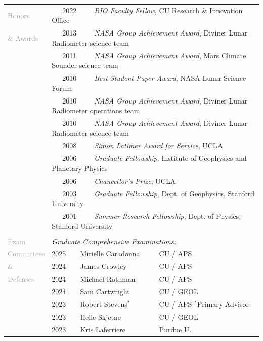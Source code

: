 \documentclass[letterpaper,10pt,twoside]{article}
\begin{document}
\noindent \begin{tabular}{@{} l l l l}
\large{\textcolor{darkgray}{Honors}} & \multicolumn{3}{l}{~~~2022~~~~~\textit{RIO Faculty Fellow}, CU Research \& Innovation Office} \\
\large{\textcolor{darkgray}{\& Awards}} & \multicolumn{3}{l}{~~~2013~~~~~\textit{NASA Group Achievement Award}, Diviner Lunar Radiometer science team} \\
 & \multicolumn{3}{l}{~~~2011~~~~~\textit{NASA Group Achievement Award}, Mars Climate Sounder science team} \\
 & \multicolumn{3}{l}{~~~2010~~~~~\textit{Best Student Paper Award}, NASA Lunar Science Forum} \\
 & \multicolumn{3}{l}{~~~2010~~~~~\textit{NASA Group Achievement Award}, Diviner Lunar Radiometer operations team} \\
 & \multicolumn{3}{l}{~~~2010~~~~~\textit{NASA Group Achievement Award}, Diviner Lunar Radiometer science team} \\
 & \multicolumn{3}{l}{~~~2008~~~~~\textit{Simon Latimer Award for Service}, UCLA} \\
 & \multicolumn{3}{l}{~~~2006~~~~~\textit{Graduate Fellowship}, Institute of Geophysics and Planetary Physics} \\
 & \multicolumn{3}{l}{~~~2006~~~~~\textit{Chancellor's Prize}, UCLA} \\
 & \multicolumn{3}{l}{~~~2003~~~~~\textit{Graduate Fellowship}, Dept. of Geophysics, Stanford University} \\
 & \multicolumn{3}{l}{~~~2001~~~~~\textit{Summer Research Fellowship}, Dept. of Physics, Stanford University} \\
& \\
\large{\textcolor{darkgray}{Exam}} & \multicolumn{3}{l}{\textit{Graduate Comprehensive Examinations:}} \\
\large{\textcolor{darkgray}{Committees}} & 2025 & Mirielle Caradonna & CU / APS \\
\large{\textcolor{darkgray}{\&}} & 2024 & James Crowley & CU / APS \\
\large{\textcolor{darkgray}{Defenses}} & 2024 & Michael Rothman & CU / APS \\
& 2024 & Sam Cartwright & CU / GEOL \\
& 2023 & Robert Stevens$^*$ & CU / APS \hspace{1em} $^*$Primary Advisor \\
& 2023 & Helle Skjetne & CU / GEOL \\
& 2023 & Kris Laferriere & Purdue U. \\

\end{tabular}
\end{document}
